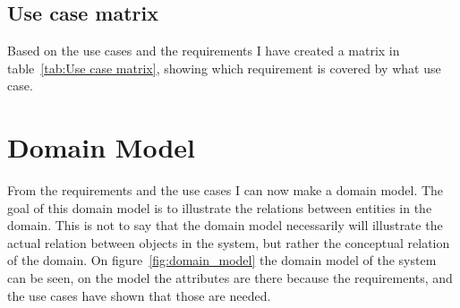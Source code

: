 \subsection{Use case matrix}
\label{sub:Use case matrix}
Based on the use cases and the requirements I have created a matrix in table~\ref{tab:Use case matrix}, showing which requirement is covered by what use case.

\begin{table}[h]
\caption{Use case matrix showing which use cases cover what requirements}
\label{tab:Use case matrix}
\end{table}

\section{Domain Model}
\label{sec:Domain Model}
From the requirements and the use cases I can now make a domain model. The goal of this domain model is to illustrate the relations between entities in the domain\cite{larman}. This is not to say that the domain model necessarily will illustrate the actual relation between objects in the system, but rather the conceptual relation of the domain. On figure~\ref{fig:domain_model} the domain model of  the system can be seen, on the model the attributes are there because the requirements, and the use cases have shown that those are needed.

